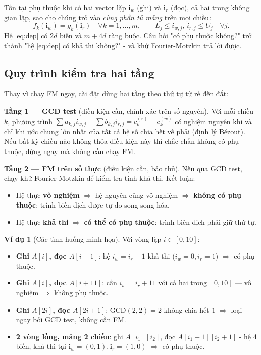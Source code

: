 \documentclass[12pt,a4paper]{article}
\theoremstyle{definition}
\newtheorem{example}{Ví dụ}[section]
\begin{document}
Tồn tại phụ thuộc khi có hai vector lặp $\mathbf{i}_w$ (ghi) và $\mathbf{i}_r$
(đọc), cả hai trong không gian lặp, sao cho chúng trỏ vào \emph{cùng phần tử
mảng} trên mọi chiều:
\begin{equation}
    f_k(\mathbf{i}_w) = g_k(\mathbf{i}_r) \quad \forall k = 1,\ldots,m,
    \qquad L_j \le i_{w,j},\, i_{r,j} \le U_j \quad \forall j.
    \label{eq:dep}
\end{equation}
Hệ \eqref{eq:dep} có $2d$ biến và $m + 4d$ ràng buộc. Câu hỏi "có phụ thuộc
không?" trở thành "hệ \eqref{eq:dep} có khả thi không?" - và khử
Fourier-Motzkin trả lời được.

\subsection{Quy trình kiểm tra hai tầng}

Thay vì chạy FM ngay, cài đặt dùng hai tầng theo thứ tự từ rẻ đến đắt:

\textbf{Tầng 1 — GCD test} (điều kiện cần, chính xác trên số nguyên). Với mỗi
chiều $k$, phương trình $\sum a_{k,j} i_{w,j} - \sum b_{k,j} i_{r,j} =
c_k^{(r)} - c_k^{(w)}$ có nghiệm nguyên khi và chỉ khi ước chung lớn nhất của
tất cả hệ số chia hết vế phải (định lý Bézout). Nếu bất kỳ chiều nào không thỏa
điều kiện này thì chắc chắn không có phụ thuộc, dừng ngay mà không cần chạy FM.

\textbf{Tầng 2 — FM trên số thực} (điều kiện cần, bảo thủ). Nếu qua
GCD test, chạy khử Fourier-Motzkin để kiểm tra tính khả thi. Kết luận:
\begin{itemize}
    \item Hệ thực \textbf{vô nghiệm} $\Rightarrow$ hệ nguyên cũng vô nghiệm
          $\Rightarrow$ \textbf{không có phụ thuộc}: trình biên dịch được tự do
          song song hóa.
    \item Hệ thực \textbf{khả thi} $\Rightarrow$ \textbf{có thể có phụ thuộc}:
          trình biên dịch phải giữ thứ tự.
\end{itemize}

\begin{example}[Các tình huống minh họa]
Với vòng lặp $i \in [0, 10]$:
\begin{itemize}
    \item \textbf{Ghi $A[i]$, đọc $A[i-1]$}: hệ $i_w = i_r - 1$ khả thi
          ($i_w{=}0, i_r{=}1$) $\Rightarrow$ có phụ thuộc.
    \item \textbf{Ghi $A[i]$, đọc $A[i+11]$}: cần $i_w = i_r + 11$ với cả hai
          trong $[0,10]$ — vô nghiệm $\Rightarrow$ không phụ thuộc.
    \item \textbf{Ghi $A[2i]$, đọc $A[2i+1]$}: GCD$(2,2)=2$ không chia hết $1$
          $\Rightarrow$ loại ngay bởi GCD test, không cần FM.
    \item \textbf{2 vòng lồng, mảng 2 chiều}: ghi $A[i_1][i_2]$, đọc
          $A[i_1-1][i_2+1]$ - hệ 4 biến, khả thi tại
          $\mathbf{i}_w=(0,1), \mathbf{i}_r=(1,0)$ $\Rightarrow$ có phụ thuộc.
\end{itemize}
\end{example}
\end{document}
